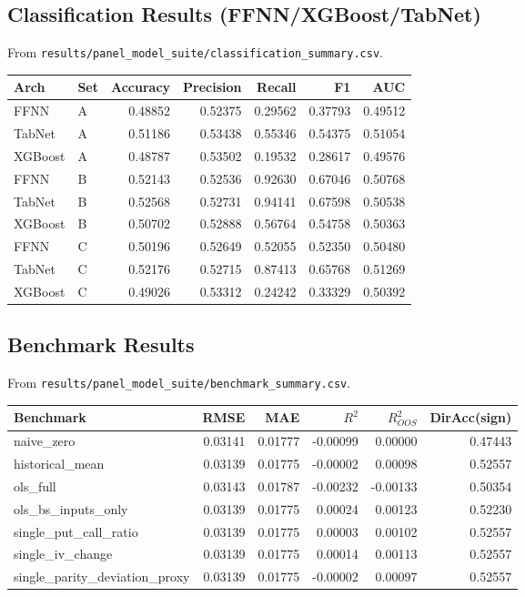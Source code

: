 \documentclass[11pt]{article}
\begin{document}
\subsection{Classification Results (FFNN/XGBoost/TabNet)}
From \texttt{results/panel\_model\_suite/classification\_summary.csv}.

\begin{footnotesize}
\begin{longtable}{l l r r r r r}
\toprule
Arch & Set & Accuracy & Precision & Recall & F1 & AUC \\
\midrule
\endhead
FFNN & A & 0.48852 & 0.52375 & 0.29562 & 0.37793 & 0.49512 \\
TabNet & A & 0.51186 & 0.53438 & 0.55346 & 0.54375 & 0.51054 \\
XGBoost & A & 0.48787 & 0.53502 & 0.19532 & 0.28617 & 0.49576 \\
FFNN & B & 0.52143 & 0.52536 & 0.92630 & 0.67046 & 0.50768 \\
TabNet & B & 0.52568 & 0.52731 & 0.94141 & 0.67598 & 0.50538 \\
XGBoost & B & 0.50702 & 0.52888 & 0.56764 & 0.54758 & 0.50363 \\
FFNN & C & 0.50196 & 0.52649 & 0.52055 & 0.52350 & 0.50480 \\
TabNet & C & 0.52176 & 0.52715 & 0.87413 & 0.65768 & 0.51269 \\
XGBoost & C & 0.49026 & 0.53312 & 0.24242 & 0.33329 & 0.50392 \\
\bottomrule
\end{longtable}
\end{footnotesize}

\subsection{Benchmark Results}
From \texttt{results/panel\_model\_suite/benchmark\_summary.csv}.

\begin{footnotesize}
\begin{longtable}{l r r r r r}
\toprule
Benchmark & RMSE & MAE & $R^2$ & $R^2_{OOS}$ & DirAcc(sign) \\
\midrule
\endhead
naive\_zero & 0.03141 & 0.01777 & -0.00099 & 0.00000 & 0.47443 \\
historical\_mean & 0.03139 & 0.01775 & -0.00002 & 0.00098 & 0.52557 \\
ols\_full & 0.03143 & 0.01787 & -0.00232 & -0.00133 & 0.50354 \\
ols\_bs\_inputs\_only & 0.03139 & 0.01775 & 0.00024 & 0.00123 & 0.52230 \\
single\_put\_call\_ratio & 0.03139 & 0.01775 & 0.00003 & 0.00102 & 0.52557 \\
single\_iv\_change & 0.03139 & 0.01775 & 0.00014 & 0.00113 & 0.52557 \\
single\_parity\_deviation\_proxy & 0.03139 & 0.01775 & -0.00002 & 0.00097 & 0.52557 \\
\bottomrule
\end{longtable}
\end{footnotesize}
\end{document}
